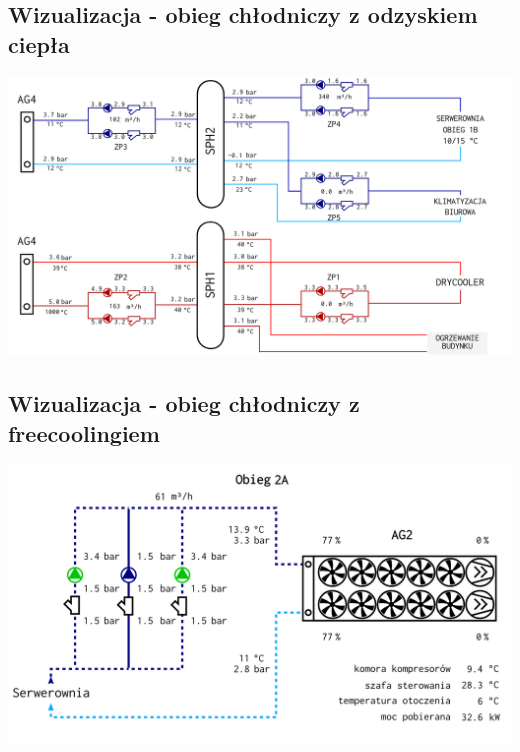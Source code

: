 \documentclass[aspectratio=169]{beamer} %
\begin{document}
\subsection{Wizualizacja - obieg chłodniczy z odzyskiem ciepła}
\begin{frame}[fragile]
\begin{center}\includegraphics[width=.8\textwidth]{monitoring_obiektow_data_center-img/monitoring_dc-chlodzenie1}\end{center}
\end{frame}

\subsection{Wizualizacja - obieg chłodniczy z freecoolingiem}
\begin{frame}[fragile]
\begin{center}\includegraphics[width=.8\textwidth]{monitoring_obiektow_data_center-img/monitoring_dc-chodzenie2}\end{center}
\end{frame}
\end{document}
